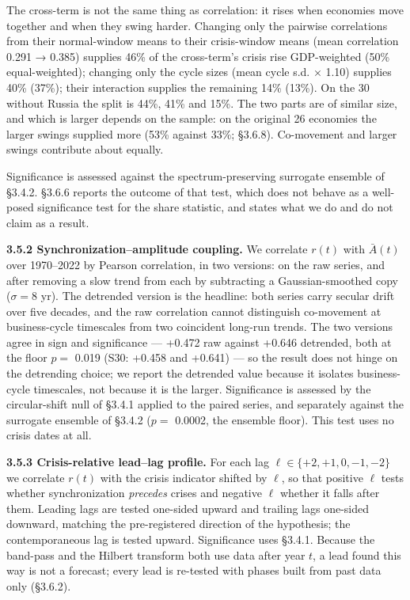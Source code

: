 \documentclass[11pt,a4paper]{article}
\begin{document}
The cross-term is not the same thing as correlation: it rises when economies move together and when they swing harder. Changing only the pairwise correlations from their normal-window means to their crisis-window means (mean correlation 0.291 → 0.385) supplies 46\% of the cross-term's crisis rise GDP-weighted (50\% equal-weighted); changing only the cycle sizes (mean cycle s.d. × 1.10) supplies 40\% (37\%); their interaction supplies the remaining 14\% (13\%). On the 30 without Russia the split is 44\%, 41\% and 15\%. The two parts are of similar size, and which is larger depends on the sample: on the original 26 economies the larger swings supplied more (53\% against 33\%; §3.6.8). Co-movement and larger swings contribute about equally.

Significance is assessed against the spectrum-preserving surrogate ensemble of §3.4.2. §3.6.6 reports the outcome of that test, which does not behave as a well-posed significance test for the share statistic, and states what we do and do not claim as a result.

\textbf{3.5.2 Synchronization–amplitude coupling.} We correlate \(r(t)\) with \(\bar{A}(t)\) over 1970–2022 by Pearson correlation, in two versions: on the raw series, and after removing a slow trend from each by subtracting a Gaussian-smoothed copy (\(\sigma = 8\) yr). The detrended version is the headline: both series carry secular drift over five decades, and the raw correlation cannot distinguish co-movement at business-cycle timescales from two coincident long-run trends. The two versions agree in sign and significance — +0.472 raw against +0.646 detrended, both at the floor \(p =\) 0.019 (S30: +0.458 and +0.641) — so the result does not hinge on the detrending choice; we report the detrended value because it isolates business-cycle timescales, not because it is the larger. Significance is assessed by the circular-shift null of §3.4.1 applied to the paired series, and separately against the surrogate ensemble of §3.4.2 (\(p =\) 0.0002, the ensemble floor). This test uses no crisis dates at all.

\textbf{3.5.3 Crisis-relative lead–lag profile.} For each lag \(\ell \in \{+2, +1, 0, -1, -2\}\) we correlate \(r(t)\) with the crisis indicator shifted by \(\ell\), so that positive \(\ell\) tests whether synchronization \emph{precedes} crises and negative \(\ell\) whether it falls after them. Leading lags are tested one-sided upward and trailing lags one-sided downward, matching the pre-registered direction of the hypothesis; the contemporaneous lag is tested upward. Significance uses §3.4.1. Because the band-pass and the Hilbert transform both use data after year \(t\), a lead found this way is not a forecast; every lead is re-tested with phases built from past data only (§3.6.2).
\end{document}
